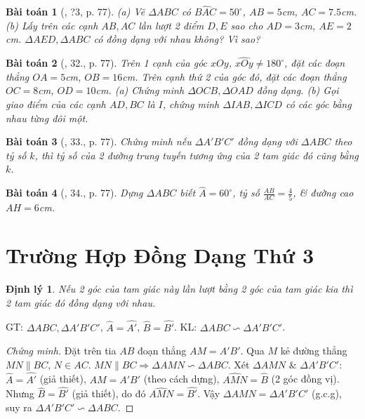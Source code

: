 \documentclass{article}
\newtheorem{baitoan}{Bài toán}
\newtheorem{dinhly}{Định lý}
\begin{document}
\begin{baitoan}[\cite{SGK_Toan_8_tap_2}, ?3, p. 77]
	(a) Vẽ $\Delta ABC$ có $\widehat{BAC} = 50^\circ$, $AB = 5$\emph{cm}, $AC = 7.5$\emph{cm}. (b) Lấy trên các cạnh $AB,AC$ lần lượt 2 điểm $D,E$ sao cho $AD = 3$\emph{cm}, $AE = 2$\emph{cm}. $\Delta AED,\Delta ABC$ có đồng dạng với nhau không? Vì sao?
\end{baitoan}

\begin{baitoan}[\cite{SGK_Toan_8_tap_2}, 32., p. 77]
	Trên 1 cạnh của góc $xOy$, $\widehat{xOy}\ne180^\circ$, đặt các đoạn thẳng $OA = 5$\emph{cm}, $OB = 16$\emph{cm}. Trên cạnh thứ 2 của góc đó, đặt các đoạn thẳng $OC = 8$\emph{cm}, $OD = 10$\emph{cm}. (a) Chứng minh $\Delta OCB,\Delta OAD$ đồng dạng. (b) Gọi giao điểm của các cạnh $AD,BC$ là $I$, chứng minh $\Delta IAB,\Delta ICD$ có các góc bằng nhau từng đôi một.
\end{baitoan}

\begin{baitoan}[\cite{SGK_Toan_8_tap_2}, 33., p. 77]
	Chứng minh nếu $\Delta A'B'C'$ đồng dạng với $\Delta ABC$ theo tỷ số $k$, thì tỷ số của 2 đường trung tuyến tương ứng của 2 tam giác đó cũng bằng $k$.
\end{baitoan}

\begin{baitoan}[\cite{SGK_Toan_8_tap_2}, 34., p. 77]
	Dựng $\Delta ABC$ biết $\widehat{A} = 60^\circ$, tỷ số $\frac{AB}{AC} = \frac{4}{5}$, \& đường cao $AH = 6$\emph{cm}.
\end{baitoan}


\section{Trường Hợp Đồng Dạng Thứ 3}

\begin{dinhly}
	Nếu 2 góc của tam giác này lần lượt bằng 2 góc của tam giác kia thì 2 tam giác đó đồng dạng với nhau.
\end{dinhly}
GT: $\Delta ABC,\Delta A'B'C'$, $\widehat{A} = \widehat{A'}$, $\widehat{B} = \widehat{B'}$. KL: $\Delta ABC\backsim\Delta A'B'C'$.

\begin{proof}[Chứng minh]
	Đặt trên tia $AB$ đoạn thẳng $AM = A'B'$. Qua $M$ kẻ đường thẳng $MN\parallel BC$, $N\in AC$. $MN\parallel BC\Rightarrow\Delta AMN\backsim\Delta ABC$. Xét $\Delta AMN$ \& $\Delta A'B'C'$: $\widehat{A} = \widehat{A'}$ (giả thiết), $AM = A'B'$ (theo cách dựng), $\widehat{AMN} = \widehat{B}$ (2 góc đồng vị). Nhưng $\widehat{B} = \widehat{B'}$ (giả thiết), do đó $\widehat{AMN} = \widehat{B'}$. Vậy $\Delta AMN = \Delta A'B'C'$ (g.c.g), suy ra $\Delta A'B'C'\backsim\Delta ABC$.
\end{proof}
\end{document}
